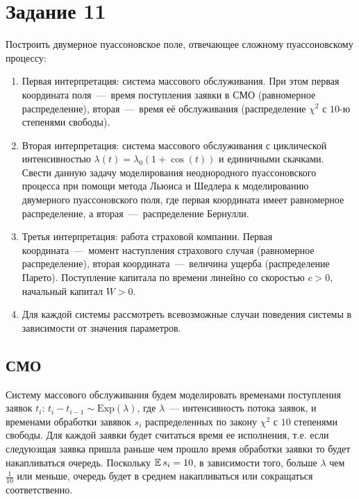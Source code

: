 \newpage
\section{Задание 11}

Построить двумерное пуассоновское поле, отвечающее сложному пуассоновскому 
процессу:
\begin{enumerate}
	\item Первая интерпретация: система массового обслуживания. При этом первая 
    координата поля~---~время поступления заявки в СМО (равномерное 
    распределение), вторая~---~время её обслуживания (распределение $\chi^2$ с 
    $10$-ю степенями свободы).

	\item Вторая интерпретация: система массового обслуживания с циклической 
    интенсивностью $\lambda(t) = \lambda_0(1+\cos(t))$ и единичными скачками. 
    Свести данную задачу моделирования неоднородного пуассоновского процесса 
    при помощи метода Льюиса и Шедлера к моделированию двумерного 
    пуассоновского поля, где первая координата имеет равномерное распределение, 
    а вторая~---~распределение Бернулли.
	
	\item Третья интерпретация: работа страховой компании. Первая 
    координата~---~момент наступления страхового случая (равномерное 
    распределение), вторая координата~---~величина ущерба (распределение 
    Парето). Поступление капитала по времени линейно со скоростью $c > 0$, 
    начальный капитал $W > 0$.
	
	\item Для каждой системы рассмотреть всевозможные случаи поведения системы 
    в зависимости от значения параметров.
\end{enumerate}

\subsection{СМО}
    Систему массового обслуживания будем моделировать временами поступления 
    заявок $t_i$: $t_i - t_{i-1} \sim \mathrm{Exp}(\lambda)$, где $\lambda$~--- 
    интенсивность потока заявок, и временами обработки завявок $s_i$ 
    распределенных по закону $\chi^2$ с $10$ степенями свободы. Для каждой 
    заявки будет считаться время ее исполнения, т.е. если следуюзщая заявка 
    пришла раньше чем прошло время обработки заявки то будет накапливаться 
    очередь. Поскольку $\operatorname{\mathbb{E}} s_i = 10$, в зависимости того, больше $\lambda$ чем
    $\frac{1}{10}$ или меньше, очередь будет в среднем накапливаться или 
    сокращаться соответственно.

